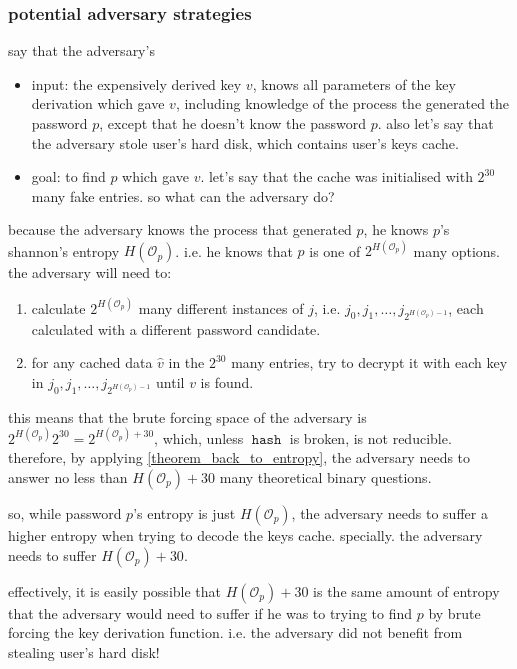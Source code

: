 \documentclass[twocolumn]{article}
\DeclareMathOperator{\hash}{\mathtt{hash}}
\begin{document}
\subsubsection{potential adversary strategies}
say that the adversary's
\begin{itemize}
    \item input: the expensively derived key $v$, knows all parameters of
    the key derivation which gave $v$, including knowledge of the process
    the generated the password $p$, except that he doesn't know the
    password $p$.  also let's say that the adversary stole user's hard
    disk, which contains user's keys cache.

    \item goal: to find $p$ which gave $v$.  let's say that the cache was
    initialised with $2^{30}$ many fake entries.  so what can the adversary
    do?
\end{itemize}

because the adversary knows the process that generated $p$, he knows $p$'s
shannon's entropy $H(\mathcal{O}_p)$.  i.e. he knows that $p$ is one of
$2^{H(\mathcal{O}_p)}$ many options.  the adversary will need to:
\begin{enumerate}
    \item calculate $2^{H(\mathcal{O}_p)}$ many different instances of $j$,
    i.e.  $j_0, j_1, \ldots, j_{2^{H(\mathcal{O}_p)-1}}$, each calculated
    with a different password candidate.

    \item for any cached data $\hat v$ in the $2^{30}$ many entries, try to
    decrypt it with each key in $j_0, j_1, \ldots,
    j_{2^{H(\mathcal{O}_p)-1}}$ until $v$ is found.
\end{enumerate}

this means that the brute forcing space of the adversary is
$2^{H(\mathcal{O}_p)} 2^{30} = 2^{H(\mathcal{O}_p) + 30}$, which, unless
$\hash$ is broken, is not reducible.  therefore, by applying
\cref{theorem_back_to_entropy}, the adversary needs to answer no less
than $H(\mathcal{O}_p) + 30$ many theoretical binary questions.

so, while password $p$'s entropy is just $H(\mathcal{O}_p)$, the adversary
needs to suffer a higher entropy when trying to decode the keys cache.
specially. the adversary needs to suffer $H(\mathcal{O}_p) + 30$.

effectively, it is easily possible that $H(\mathcal{O}_p) + 30$ is the same
amount of entropy that the adversary would need to suffer if he was to
trying to find $p$ by brute forcing the key derivation function.  i.e. the
adversary did not benefit from stealing user's hard disk!
\end{document}

